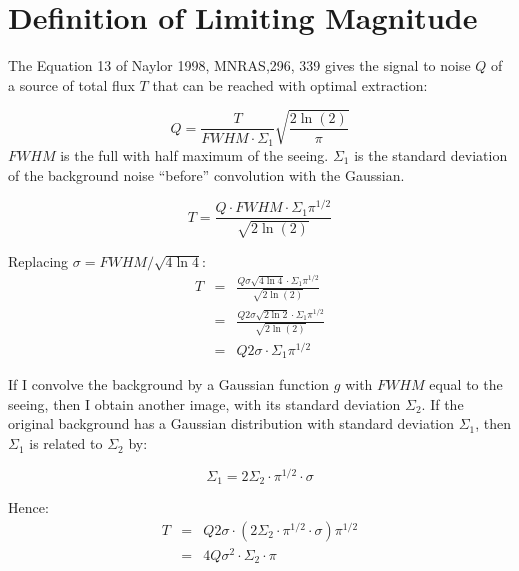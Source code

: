 \section{Definition of Limiting Magnitude}
\label{chap:algorithms:maglim}


The Equation 13 of Naylor 1998, MNRAS,296, 339 gives the signal to
noise $Q$ of a source of total flux $T$ that can be reached with
optimal extraction:

\begin{equation}
Q=\frac{T}{FWHM\cdot\Sigma_1}\sqrt{\frac{2\ln(2)}{\pi}}
\end{equation}
$FWHM$ is the full with half maximum of the seeing.
$\Sigma_1$ is the standard deviation of the background noise ``before'' convolution with the Gaussian.


\begin{equation}
T=\frac{Q \cdot FWHM \cdot \Sigma_1 \pi^{1/2}}{\sqrt{2\ln(2)}}
\end{equation}

Replacing $\sigma =  FWHM/\sqrt{4\ln4}$:
\begin{eqnarray}
T&=&\frac{Q  \sigma\sqrt{4\ln4}  \cdot \Sigma_1 \pi^{1/2}}{\sqrt{2\ln(2)}}\nonumber\\
 &=&\frac{Q  2\sigma\sqrt{2\ln2}  \cdot \Sigma_1 \pi^{1/2}}{\sqrt{2\ln(2)}}\nonumber\\
 &=& Q  2\sigma  \cdot \Sigma_1 \pi^{1/2}
\end{eqnarray}

If I convolve the background by a Gaussian function $g$ with $FWHM$
equal to the seeing, then I obtain another image, with its standard
deviation $\Sigma_2$. If the original background has a Gaussian
distribution with standard deviation $\Sigma_1$, then $\Sigma_1$ is
related to $\Sigma_2$ by:

\begin{equation}
\Sigma_1 = 2 \Sigma_2 \cdot \pi^{1/2} \cdot \sigma
\label{eqn:noise_conv}
\end{equation}

Hence:
\begin{eqnarray}
T&=& Q  2\sigma  \cdot \left( 2\Sigma_2  \cdot \pi^{1/2} \cdot \sigma \right) \pi^{1/2}\nonumber\\
&=& 4 Q  \sigma^2  \cdot \Sigma_2  \cdot \pi 
\end{eqnarray}

